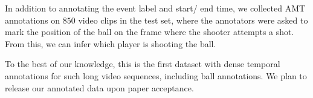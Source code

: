 In addition to annotating the event label and start/ end time,
we collected AMT annotations on $850$ video clips in the test
set, where the annotators were asked to mark the position of the ball
on the frame where the shooter attempts a shot.
From this, we can infer which player is shooting the ball.

To the best of our
knowledge, this is the first dataset with dense temporal annotations for
such long video sequences, including ball annotations.
We plan to release our annotated data upon paper
acceptance.
